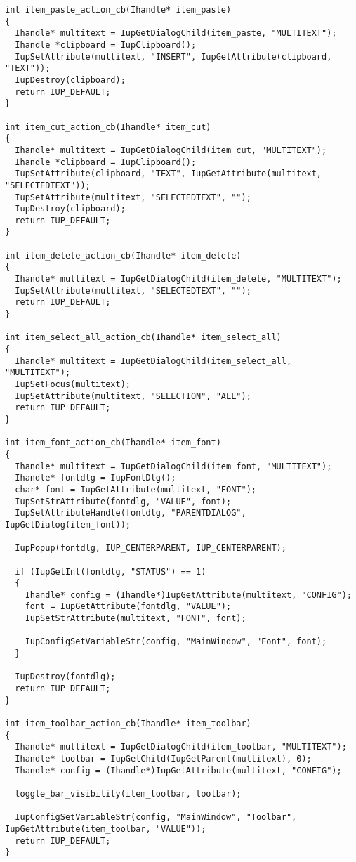 \documentclass{ctexart}
\begin{document}
\begin{lstlisting}
int item_paste_action_cb(Ihandle* item_paste) 
{
  Ihandle* multitext = IupGetDialogChild(item_paste, "MULTITEXT");
  Ihandle *clipboard = IupClipboard();
  IupSetAttribute(multitext, "INSERT", IupGetAttribute(clipboard, "TEXT"));
  IupDestroy(clipboard);
  return IUP_DEFAULT;
}

int item_cut_action_cb(Ihandle* item_cut) 
{
  Ihandle* multitext = IupGetDialogChild(item_cut, "MULTITEXT");
  Ihandle *clipboard = IupClipboard();
  IupSetAttribute(clipboard, "TEXT", IupGetAttribute(multitext, "SELECTEDTEXT"));
  IupSetAttribute(multitext, "SELECTEDTEXT", "");
  IupDestroy(clipboard);
  return IUP_DEFAULT;
}

int item_delete_action_cb(Ihandle* item_delete) 
{
  Ihandle* multitext = IupGetDialogChild(item_delete, "MULTITEXT");
  IupSetAttribute(multitext, "SELECTEDTEXT", "");
  return IUP_DEFAULT;
}

int item_select_all_action_cb(Ihandle* item_select_all) 
{
  Ihandle* multitext = IupGetDialogChild(item_select_all, "MULTITEXT");
  IupSetFocus(multitext);
  IupSetAttribute(multitext, "SELECTION", "ALL");
  return IUP_DEFAULT;
}

int item_font_action_cb(Ihandle* item_font)
{
  Ihandle* multitext = IupGetDialogChild(item_font, "MULTITEXT");
  Ihandle* fontdlg = IupFontDlg();
  char* font = IupGetAttribute(multitext, "FONT");
  IupSetStrAttribute(fontdlg, "VALUE", font);
  IupSetAttributeHandle(fontdlg, "PARENTDIALOG", IupGetDialog(item_font));

  IupPopup(fontdlg, IUP_CENTERPARENT, IUP_CENTERPARENT);

  if (IupGetInt(fontdlg, "STATUS") == 1)
  {
    Ihandle* config = (Ihandle*)IupGetAttribute(multitext, "CONFIG");
    font = IupGetAttribute(fontdlg, "VALUE");
    IupSetStrAttribute(multitext, "FONT", font);

    IupConfigSetVariableStr(config, "MainWindow", "Font", font);
  }

  IupDestroy(fontdlg);
  return IUP_DEFAULT;
}

int item_toolbar_action_cb(Ihandle* item_toolbar)
{
  Ihandle* multitext = IupGetDialogChild(item_toolbar, "MULTITEXT");
  Ihandle* toolbar = IupGetChild(IupGetParent(multitext), 0);
  Ihandle* config = (Ihandle*)IupGetAttribute(multitext, "CONFIG");

  toggle_bar_visibility(item_toolbar, toolbar);

  IupConfigSetVariableStr(config, "MainWindow", "Toolbar", IupGetAttribute(item_toolbar, "VALUE"));
  return IUP_DEFAULT;
}


\end{lstlisting}
\end{document}
